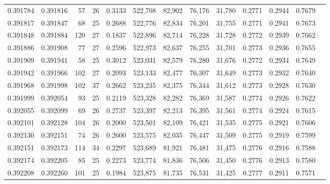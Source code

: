 \begin{tabular}{rrrrrrrrrrrrr}
0.391784 & 0.391816 &    57 &  26 &                                     0.3133 & 522,708 &  82,902 &  76,176 &  31,780 & 0.2771 & 0.2944 & 0.7679 \\
0.391817 & 0.391847 &    68 &  25 &                                     0.2688 & 522,776 &  82,834 &  76,201 &  31,755 & 0.2771 & 0.2941 & 0.7673 \\
0.391848 & 0.391884 &   120 &  27 &                                     0.1837 & 522,896 &  82,714 &  76,228 &  31,728 & 0.2772 & 0.2939 & 0.7662 \\
0.391886 & 0.391908 &    77 &  27 &                                     0.2596 & 522,973 &  82,637 &  76,255 &  31,701 & 0.2773 & 0.2936 & 0.7655 \\
0.391909 & 0.391941 &    58 &  25 &                                     0.3012 & 523,031 &  82,579 &  76,280 &  31,676 & 0.2772 & 0.2934 & 0.7649 \\
0.391942 & 0.391966 &   102 &  27 &                                     0.2093 & 523,133 &  82,477 &  76,307 &  31,649 & 0.2773 & 0.2932 & 0.7640 \\
0.391968 & 0.391998 &   102 &  37 &                                     0.2662 & 523,235 &  82,375 &  76,344 &  31,612 & 0.2773 & 0.2928 & 0.7630 \\
0.391999 & 0.392054 &    93 &  25 &                                     0.2119 & 523,328 &  82,282 &  76,369 &  31,587 & 0.2774 & 0.2926 & 0.7622 \\
0.392055 & 0.392099 &    69 &  26 &                                     0.2737 & 523,397 &  82,213 &  76,395 &  31,561 & 0.2774 & 0.2924 & 0.7615 \\
0.392101 & 0.392128 &   104 &  26 &                                     0.2000 & 523,501 &  82,109 &  76,421 &  31,535 & 0.2775 & 0.2921 & 0.7606 \\
0.392130 & 0.392151 &    74 &  26 &                                     0.2600 & 523,575 &  82,035 &  76,447 &  31,509 & 0.2775 & 0.2919 & 0.7599 \\
0.392151 & 0.392173 &   114 &  34 &                                     0.2297 & 523,689 &  81,921 &  76,481 &  31,475 & 0.2776 & 0.2916 & 0.7588 \\
0.392174 & 0.392205 &    85 &  25 &                                     0.2273 & 523,774 &  81,836 &  76,506 &  31,450 & 0.2776 & 0.2913 & 0.7580 \\
0.392208 & 0.392260 &   101 &  25 &                                     0.1984 & 523,875 &  81,735 &  76,531 &  31,425 & 0.2777 & 0.2911 & 0.7571 \\

\end{tabular}
